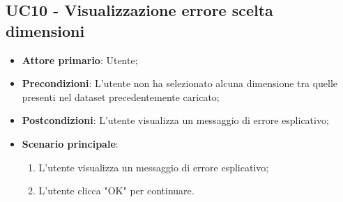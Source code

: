 \subsection{UC10 - Visualizzazione errore scelta dimensioni}
\begin{itemize}
	\item \textbf{Attore primario}: Utente;
	\item \textbf{Precondizioni}: L'utente non ha selezionato alcuna dimensione tra quelle presenti nel dataset precedentemente caricato;
	\item \textbf{Postcondizioni}: L'utente visualizza un messaggio di errore esplicativo;
	\item \textbf{Scenario principale}:
		\begin{enumerate}
			\item L'utente visualizza un messaggio di errore esplicativo;
			\item L'utente clicca "OK" per continuare.
		\end{enumerate}
\end{itemize}